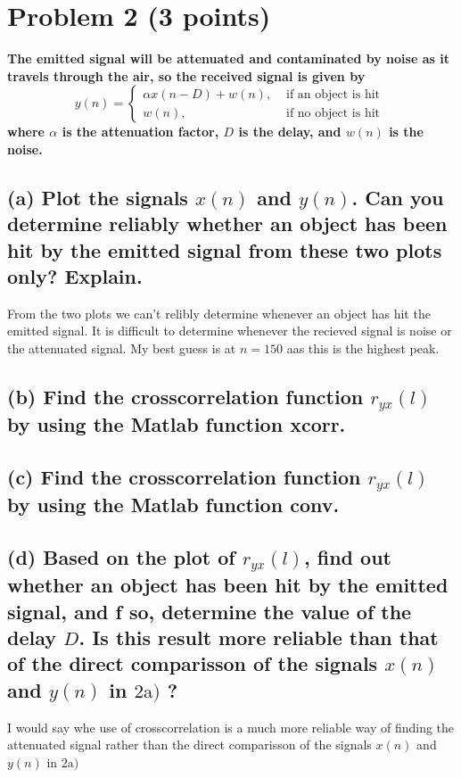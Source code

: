 \section{Problem 2 (3 points)}

\textbf{The emitted signal will be attenuated and contaminated by noise as it travels through the air, so the received signal is given by
$$
y(n)= \begin{cases}\alpha x(n-D)+w(n), & \text { if an object is hit } \\ w(n), & \text { if no object is hit }\end{cases}
$$
where $\alpha$ is the attenuation factor, $D$ is the delay, and $w(n)$ is the noise.}

\subsection*{(a) Plot the signals $x(n)$ and $y(n)$. Can you determine reliably whether an object has been hit by the emitted signal from these two plots only? Explain.}



From the two plots we can't relibly determine whenever an object has hit the emitted signal. It is difficult to determine whenever the recieved signal is noise or the attenuated signal. My best guess is at $n=150$ aas this is the highest peak.

\subsection*{(b) Find the crosscorrelation function $r_{yx}(l)$ by using the Matlab function
xcorr.}


\subsection*{(c) Find the crosscorrelation function $r_{yx}(l)$ by using the Matlab function
conv.}


\subsection*{(d) Based on the plot of $r_{y x}(l)$, find out whether an object has been hit by the emitted signal, and f so, determine the value of the delay $D$. Is this result more reliable than that of the direct comparisson of the signals $x(n)$ and $y(n)$ in $2 \mathrm{a})$ ?}

I would say whe use of crosscorrelation is a much more reliable way of finding the attenuated signal rather than the direct comparisson of the signals $x(n)$ and $y(n)$ in $2 \mathrm{a})$
